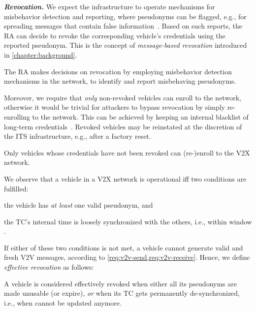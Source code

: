 \noindent\textbf{\emph{Revocation.}} We expect the infrastructure to operate
mechanisms for misbehavior detection and reporting, where pseudonyms can be
flagged, e.g., for spreading messages that contain false
information~\cite{brecht2018scms,etsi2020tr103460}. Based on such reports, the
\ac{RA} can decide to revoke the corresponding vehicle's credentials using the
reported pseudonym. This is the concept of \emph{message-based revocation}
introduced in \cref{chapter:background}.
%
\begin{req}
    \label{req:revocation}
    The \ac{RA} makes decisions on revocation by employing misbehavior detection
    mechanisms in the network, to identify and report misbehaving pseudonyms.
\end{req}
Moreover, we require that \emph{only} non-revoked vehicles can enroll to the
network, otherwise it would be trivial for attackers to bypass revocation by
simply re-enrolling to the network. This can be achieved by keeping an internal
blacklist of long-term credentials~\cite{etsi2022102941,brecht2018scms}. Revoked
vehicles may be reinstated at the discretion of the \ac{ITS} infrastructure,
e.g., after a factory reset.
%
\begin{req}
  \label{req:revoked}
    Only vehicles whose credentials have not been revoked can (re-)enroll to the
    \ac{V2X} network.
\end{req}
%
We observe that a vehicle in a \ac{V2X} network is operational iff two
conditions are fulfilled:
%
\begin{inparaenum}
    \item the vehicle has \emph{at least} one valid pseudonym, and
    \item the \ac{TC}'s internal time \funcnow{} is loosely synchronized with
    the others, i.e., within window \paramtt.
\end{inparaenum}
%
If either of these two conditions is not met, a vehicle cannot generate valid
and fresh \ac{V2V} messages, according to \cref{req:v2v-send,req:v2v-receive}.
Hence, we define \emph{effective revocation} as follows:
%
\begin{defn}
A vehicle is considered effectively revoked when either all its pseudonyms are
made unusable (or expire), \emph{or} when its \ac{TC} gets permanently
de-synchronized, i.e., when \funcnow{} cannot be updated anymore.
\end{defn}



